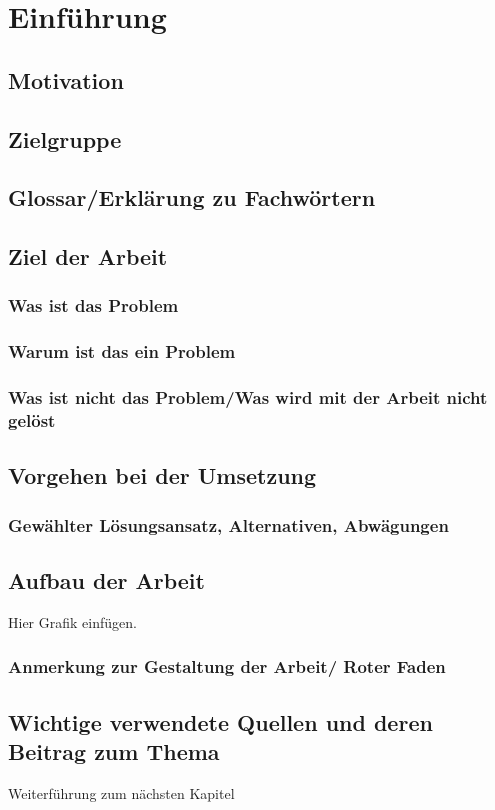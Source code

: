 \section{Einführung}

\subsection{Motivation}

\subsection{Zielgruppe}

\subsection{Glossar/Erklärung zu Fachwörtern}

\subsection{Ziel der Arbeit}

\subsubsection{Was ist das Problem}
\subsubsection{Warum ist das ein Problem}
\subsubsection{Was ist nicht das Problem/Was wird mit der Arbeit nicht gelöst}

\subsection{Vorgehen bei der Umsetzung}

\subsubsection{Gewählter Lösungsansatz, Alternativen, Abwägungen}

\subsection{Aufbau der Arbeit}
Hier Grafik einfügen.
\subsubsection{Anmerkung zur Gestaltung der Arbeit/ Roter Faden}

\subsection{Wichtige verwendete Quellen und deren Beitrag zum Thema}

Weiterführung zum nächsten Kapitel